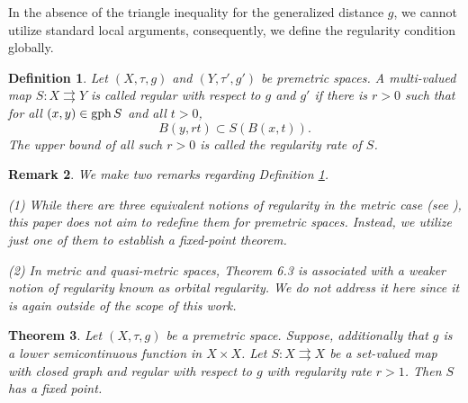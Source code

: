 \documentclass{article}
\def\gph{\mathop{\rm gph}}
\def\gph{\mathop{\rm gph}}
\newtheorem{theo}{Theorem}[section]
\newtheorem{defi}[theo]{Definition}
\newtheorem{rem}[theo]{Remark}
\begin{document}
In the absence of the triangle inequality for the generalized distance $g$, we cannot utilize standard local arguments, consequently, we define the regularity condition globally.
\begin{defi} \label{reg_rate} Let $(X, \tau, g)$ and $(Y, \tau', g')$ be premetric spaces. A  multi-valued map  $S:X \rightrightarrows Y$ is called \emph{regular} with respect to $g$ and $g'$ if there is $r>0$ such that for all $(x,y) \in \gph S$ and all $t>0$,
 \[B(y,rt) \subset S(B(x,t)).\]
The upper bound of all such $r>0$ is called the \emph{regularity rate} of $S$.
\end{defi}
\begin{rem} 
 We make two remarks regarding Definition \ref{reg_rate}.
 
(1) While there are three equivalent notions of regularity in the metric case (see \cite{Io}), this paper does not aim to redefine them for premetric spaces. Instead, we utilize just one of them to establish a fixed-point theorem.

(2) In metric and quasi-metric spaces, Theorem 6.3 is associated with a weaker notion of regularity known as orbital regularity. We do not address it here since it is again outside of the scope of this work.
\end{rem}


  
\begin{theo} \label{th:Fixed_point_regularity}
Let $(X, \tau, g)$ be a premetric space. Suppose, additionally that $g$ is a lower semicontinuous function in $X \times X$. Let $S:X \rightrightarrows X$ be a set-valued map with closed graph and regular with respect to $g$ with regularity rate $r>1$. Then $S$ has a fixed point.
\end{theo}
\end{document}
